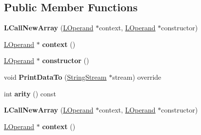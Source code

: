 \subsection*{Public Member Functions}
\begin{DoxyCompactItemize}
\item 
{\bfseries L\+Call\+New\+Array} (\hyperlink{classv8_1_1internal_1_1_l_operand}{L\+Operand} $\ast$context, \hyperlink{classv8_1_1internal_1_1_l_operand}{L\+Operand} $\ast$constructor)\hypertarget{classv8_1_1internal_1_1_l_call_new_array_a4bd46fe318f41b8ad3d446686db3e0de}{}\label{classv8_1_1internal_1_1_l_call_new_array_a4bd46fe318f41b8ad3d446686db3e0de}

\item 
\hyperlink{classv8_1_1internal_1_1_l_operand}{L\+Operand} $\ast$ {\bfseries context} ()\hypertarget{classv8_1_1internal_1_1_l_call_new_array_a7f1e1801fd731a8fbecc43a2cbf2140c}{}\label{classv8_1_1internal_1_1_l_call_new_array_a7f1e1801fd731a8fbecc43a2cbf2140c}

\item 
\hyperlink{classv8_1_1internal_1_1_l_operand}{L\+Operand} $\ast$ {\bfseries constructor} ()\hypertarget{classv8_1_1internal_1_1_l_call_new_array_aeda3b4ff8fafcf3f7b24bd8e3f64bbea}{}\label{classv8_1_1internal_1_1_l_call_new_array_aeda3b4ff8fafcf3f7b24bd8e3f64bbea}

\item 
void {\bfseries Print\+Data\+To} (\hyperlink{classv8_1_1internal_1_1_string_stream}{String\+Stream} $\ast$stream) override\hypertarget{classv8_1_1internal_1_1_l_call_new_array_add922262b764ca49467bb7797c8ee6ee}{}\label{classv8_1_1internal_1_1_l_call_new_array_add922262b764ca49467bb7797c8ee6ee}

\item 
int {\bfseries arity} () const \hypertarget{classv8_1_1internal_1_1_l_call_new_array_a82f7b48744a6d59495dd9bd36f91d611}{}\label{classv8_1_1internal_1_1_l_call_new_array_a82f7b48744a6d59495dd9bd36f91d611}

\item 
{\bfseries L\+Call\+New\+Array} (\hyperlink{classv8_1_1internal_1_1_l_operand}{L\+Operand} $\ast$context, \hyperlink{classv8_1_1internal_1_1_l_operand}{L\+Operand} $\ast$constructor)\hypertarget{classv8_1_1internal_1_1_l_call_new_array_a4bd46fe318f41b8ad3d446686db3e0de}{}\label{classv8_1_1internal_1_1_l_call_new_array_a4bd46fe318f41b8ad3d446686db3e0de}

\item 
\hyperlink{classv8_1_1internal_1_1_l_operand}{L\+Operand} $\ast$ {\bfseries context} ()\hypertarget{classv8_1_1internal_1_1_l_call_new_array_a7f1e1801fd731a8fbecc43a2cbf2140c}{}\label{classv8_1_1internal_1_1_l_call_new_array_a7f1e1801fd731a8fbecc43a2cbf2140c}


\end{DoxyCompactItemize}
